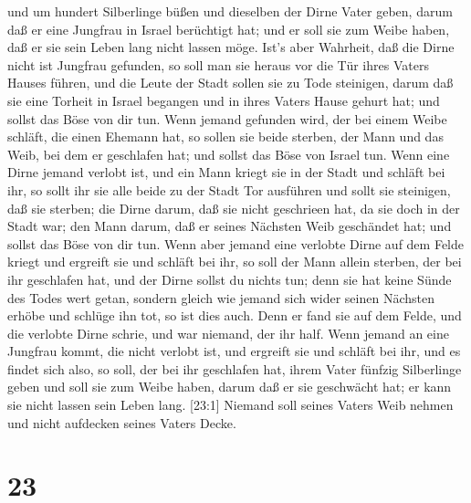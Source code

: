  und um hundert Silberlinge büßen und dieselben der Dirne
Vater geben, darum daß er eine Jungfrau in Israel berüchtigt hat; und er
soll sie zum Weibe haben, daß er sie sein Leben lang nicht lassen möge.
 Ist's aber Wahrheit, daß die Dirne nicht ist Jungfrau
gefunden,  so soll man sie heraus vor die Tür ihres Vaters
Hauses führen, und die Leute der Stadt sollen sie zu Tode steinigen,
darum daß sie eine Torheit in Israel begangen und in ihres Vaters Hause
gehurt hat; und sollst das Böse von dir tun.  Wenn jemand
gefunden wird, der bei einem Weibe schläft, die einen Ehemann hat, so
sollen sie beide sterben, der Mann und das Weib, bei dem er geschlafen
hat; und sollst das Böse von Israel tun.  Wenn eine Dirne
jemand verlobt ist, und ein Mann kriegt sie in der Stadt und schläft bei
ihr,  so sollt ihr sie alle beide zu der Stadt Tor
ausführen und sollt sie steinigen, daß sie sterben; die Dirne darum, daß
sie nicht geschrieen hat, da sie doch in der Stadt war; den Mann darum,
daß er seines Nächsten Weib geschändet hat; und sollst das Böse von dir
tun.  Wenn aber jemand eine verlobte Dirne auf dem Felde
kriegt und ergreift sie und schläft bei ihr, so soll der Mann allein
sterben, der bei ihr geschlafen hat,  und der Dirne sollst
du nichts tun; denn sie hat keine Sünde des Todes wert getan, sondern
gleich wie jemand sich wider seinen Nächsten erhöbe und schlüge ihn tot,
so ist dies auch.  Denn er fand sie auf dem Felde, und die
verlobte Dirne schrie, und war niemand, der ihr half.  Wenn
jemand an eine Jungfrau kommt, die nicht verlobt ist, und ergreift sie
und schläft bei ihr, und es findet sich also,  so soll, der
bei ihr geschlafen hat, ihrem Vater fünfzig Silberlinge geben und soll
sie zum Weibe haben, darum daß er sie geschwächt hat; er kann sie nicht
lassen sein Leben lang.  {[}23:1{]} Niemand soll seines
Vaters Weib nehmen und nicht aufdecken seines Vaters Decke.

\hypertarget{section-22}{%
\section{23}\label{section-22}}

